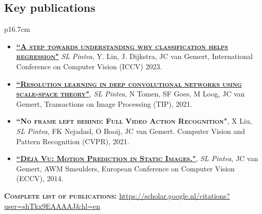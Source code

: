 \documentclass[a4paper, oneside, final]{scrartcl}
\begin{document}
\begin{center}
		
		\section{Key publications}
        \begin{tabular}{p{16.7cm}}
        \begin{flushleft}
            \vspace{-10px}
            \begin{itemize}
                \item \textsc{\textbf{\href{https://github.com/SilviaLauraPintea/reg-cls}{``A step towards understanding why classification helps regression"}}} \emph{SL Pintea}, Y. Lin, J. Dijkstra, JC van Gemert, International Conference on Computer Vision (ICCV) 2023.\\[3px]

                \item \textsc{\textbf{\href{https://github.com/SilviaLauraPintea/N-JetNet}{``Resolution learning in deep convolutional networks using scale-space theory"}}}, \emph{SL Pintea}, N Tomen, SF Goes, M Loog, JC van Gemert, Transactions on Image Processing (TIP), 2021.\\[3px]
                \item \textsc{\textbf{``No frame left behind: Full Video Action Recognition"}}, X Liu, \emph{SL Pintea}, FK Nejadasl, O Booij, JC van Gemert. Computer Vision and Pattern Recognition (CVPR), 2021.\\[3px]
        \item \textsc{\textbf{\href{http://github.com/SilviaLauraPintea/DejaVu}{``D\'{e}j\`{a} Vu: Motion Prediction in Static Images."}}}, \emph{SL Pintea}, JC van Gemert, AWM Smeulders, European Conference on Computer Vision (ECCV), 2014.\\[10px]
            \end{itemize}
            \vspace{5px}
        \textsc{\textbf{Complete list of publications:}} \href{https://scholar.google.nl/citations?user=shTkx9EAAAAJ&hl=en}{https://scholar.google.nl/citations?user=shTkx9EAAAAJ\&hl=en}\\
        \end{flushleft}
		\end{tabular}

\end{center}
\end{document}
